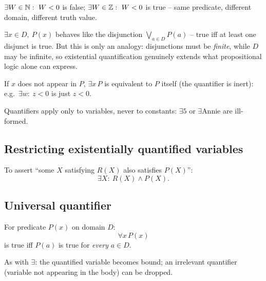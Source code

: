 \begin{note}
$\exists W\in\mathbb{N}:\ W<0$ is false; $\exists W\in\mathbb{Z}:\ W<0$ is true -- same predicate, different domain, different truth value.
\end{note}

\begin{note}
$\exists x \in D,\ P(x)$ behaves like the disjunction $\bigvee_{a\in D} P(a)$ -- true iff at least one disjunct is true. But this is only an analogy: disjunctions must be \emph{finite}, while $D$ may be infinite, so existential quantification genuinely extends what propositional logic alone can express.
\end{note}

\begin{note}
If $x$ does not appear in $P$, $\exists x\, P$ is equivalent to $P$ itself (the quantifier is inert): e.g.\ $\exists w:\ z<0$ is just $z<0$.
\end{note}

\begin{note}
Quantifiers apply only to variables, never to constants: $\exists 5$ or $\exists\text{Annie}$ are ill-formed.
\end{note}

\subsection{Restricting existentially quantified variables}
\label{sec:5-7}

\begin{note}
To assert ``some $X$ satisfying $R(X)$ also satisfies $P(X)$'':
\[
\exists X:\ R(X) \wedge P(X).
\]
\end{note}

\subsection{Universal quantifier}
\label{sec:5-8}

\begin{definition}
For predicate $P(x)$ on domain $D$:
\[
\forall x\, P(x)
\]
is true iff $P(a)$ is true for \emph{every} $a\in D$.
\end{definition}

\begin{note}
As with $\exists$: the quantified variable becomes bound; an irrelevant quantifier (variable not appearing in the body) can be dropped.
\end{note}

